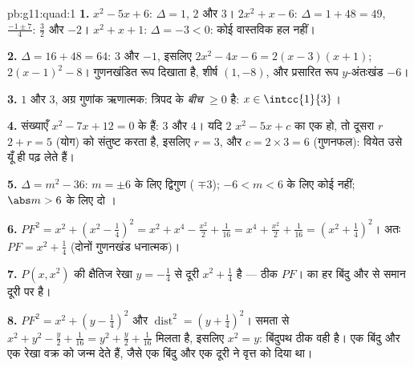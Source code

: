 \begin{solution}{pb:g11:quad:1}
\textbf{1.} $x^2 - 5x + 6$: $\Delta = 1$,  $2$ और $3$। $2x^2 + x - 6$: $\Delta = 1 + 48 = 49$,  $\frac{-1 \pm 7}{4}$: $\frac32$
और $-2$। $x^2 + x + 1$: $\Delta = -3 < 0$: कोई वास्तविक हल नहीं।

\textbf{2.} $\Delta = 16 + 48 = 64$:  $3$ और $-1$, इसलिए $2x^2 - 4x - 6 = 2(x - 3)(x + 1)$;  $2(x - 1)^2 - 8$।
गुणनखंडित रूप  दिखाता है,  शीर्ष $(1, -8)$, और प्रसारित रूप
$y$-अंतःखंड $-6$।

\textbf{3.}  $1$ और $3$, अग्र गुणांक ऋणात्मक: त्रिपद  के
\emph{बीच} $\geq 0$ है: $x \in \intcc{1}{3}$।

\textbf{4.} संख्याएँ $x^2 - 7x + 12 = 0$ के  हैं: $3$ और $4$। यदि $2$ $x^2 - 5x + c$ का
एक  हो, तो दूसरा  $r$ $2 + r = 5$ (योग) को संतुष्ट करता है, इसलिए $r = 3$,
और $c = 2 \times 3 = 6$ (गुणनफल): वियेत उसे यूँ ही पढ़ लेते हैं।

\textbf{5.} $\Delta = m^2 - 36$: $m = \pm 6$ के लिए द्विगुण  ( $\mp 3$); $-6 < m < 6$ के लिए कोई
 नहीं; $\abs m > 6$ के लिए दो ।

\textbf{6.} $PF^2 = x^2 + \left(x^2 - \frac14\right)^2
= x^2 + x^4 - \frac{x^2}{2} + \frac{1}{16}
= x^4 + \frac{x^2}{2} + \frac{1}{16}
= \left(x^2 + \frac14\right)^2$। अतः $PF = x^2 + \frac14$ (दोनों गुणनखंड धनात्मक)।

\textbf{7.} $P(x, x^2)$ की क्षैतिज रेखा $y = -\frac14$ से दूरी $x^2 + \frac14$ है --- ठीक $PF$।
 का हर बिंदु  और  से समान दूरी पर है।

\textbf{8.} $PF^2 = x^2 + \left(y - \frac14\right)^2$ और $\operatorname{dist}^2 = \left(y + \frac14\right)^2$। समता से $x^2 + y^2 - \frac y2 + \frac{1}{16} = y^2 + \frac y2 +
\frac1{16}$ मिलता है, इसलिए $x^2 = y$: बिंदुपथ
ठीक वही  है। एक बिंदु और एक रेखा वक्र को जन्म देते हैं, जैसे एक बिंदु
और एक दूरी ने वृत्त को दिया था।


\end{solution}
